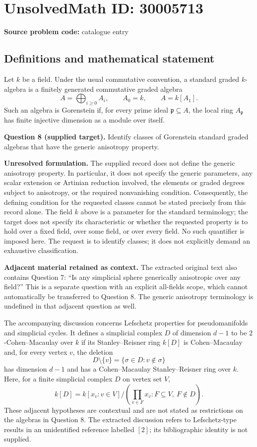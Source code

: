 \documentclass[11pt]{article}
\begin{document}
\section*{UnsolvedMath ID: 30005713}
\textbf{Source problem code:} catalogue entry
\subsection{Definitions and mathematical statement}
Let \(k\) be a field. Under the usual commutative convention, a standard graded \(k\)-algebra is a finitely generated commutative graded algebra
\[
A=\bigoplus_{i\geq 0}A_i,\qquad A_0=k,\qquad A=k[A_1].
\]
Such an algebra is Gorenstein if, for every prime ideal \(\mathfrak p\subseteq A\), the local ring \(A_{\mathfrak p}\) has finite injective dimension as a module over itself.

\textbf{Question 8 (supplied target).} Identify classes of Gorenstein standard graded algebras that have the generic anisotropy property.

\textbf{Unresolved formulation.} The supplied record does not define the generic anisotropy property. In particular, it does not specify the generic parameters, any scalar extension or Artinian reduction involved, the elements or graded degrees subject to anisotropy, or the required nonvanishing condition. Consequently, the defining condition for the requested classes cannot be stated precisely from this record alone. The field \(k\) above is a parameter for the standard terminology; the target does not specify its characteristic or whether the requested property is to hold over a fixed field, over some field, or over every field. No such quantifier is imposed here. The request is to identify classes; it does not explicitly demand an exhaustive classification.

\textbf{Adjacent material retained as context.} The extracted original text also contains Question 7: ``Is any simplicial sphere generically anisotropic over any field?'' This is a separate question with an explicit all-fields scope, which cannot automatically be transferred to Question 8. The generic anisotropy terminology is undefined in that adjacent question as well.

The accompanying discussion concerns Lefschetz properties for pseudomanifolds and simplicial cycles. It defines a simplicial complex \(D\) of dimension \(d-1\) to be \(2\)-Cohen--Macaulay over \(k\) if its Stanley--Reisner ring \(k[D]\) is Cohen--Macaulay and, for every vertex \(v\), the deletion
\[
D\setminus\{v\}=\{\sigma\in D:v\notin\sigma\}
\]
has dimension \(d-1\) and has a Cohen--Macaulay Stanley--Reisner ring over \(k\). Here, for a finite simplicial complex \(D\) on vertex set \(V\),
\[
k[D]=k[x_v:v\in V]\big/\left(\prod_{v\in F}x_v:F\subseteq V,\ F\notin D\right).
\]
These adjacent hypotheses are contextual and are not stated as restrictions on the algebras in Question 8. The extracted discussion refers to Lefschetz-type results in an unidentified reference labelled \([2]\); its bibliographic identity is not supplied.
\end{document}
